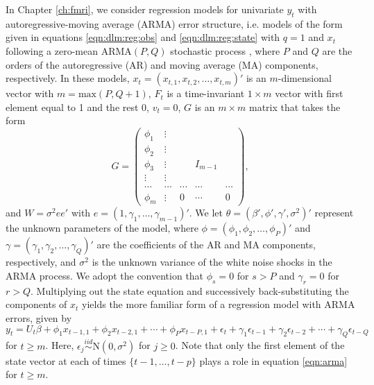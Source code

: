 In Chapter \ref{ch:fmri}, we consider regression models for univariate $y_t$ with autoregressive-moving average (ARMA) error structure, i.e. models of the form given in equations \eqref{eqn:dlm:reg:obs} and \eqref{eqn:dlm:reg:state} with $q = 1$ and $x_t$ following a zero-mean $\mbox{ARMA}(P, Q)$ stochastic process \citep{shum:stof:2006:timeseries}, where $P$ and $Q$ are the orders of the autoregressive (AR) and moving average (MA) components, respectively. In these models, $x_t = (x_{t,1} ,x_{t,2}, \ldots, x_{t,m})'$ is an $m$-dimensional vector with $m = \mbox{max}(P,Q+1)$, $F_t$ is a time-invariant $1 \times m$ vector with first element equal to 1 and the rest 0, $v_t = 0$, $G$ is an $m \times m$ matrix that takes the form
\[
G = \left(
 \begin{array}{ccccc}
 \phi_1 & \vdots \\
 \phi_2 & \vdots \\
 \phi_3 & \vdots && I_{m-1} \\
 \vdots & \vdots \\
 \cdots & \cdots & \cdots & \cdots & \cdots \\
 \phi_m &\vdots & 0 & \cdots & 0
 \end{array}
\right),
\]
and $W = \sigma^2ee'$ with $e = (1, \gamma_1, \ldots, \gamma_{m-1})'$. We let $\theta = (\beta', \phi', \gamma', \sigma^2)'$ represent the unknown parameters of the model, where $\phi = (\phi_1,\phi_2,\ldots,\phi_P)'$ and $\gamma = (\gamma_1,\gamma_2,\ldots,\gamma_Q)'$ are the coefficients of the AR and MA components, respectively, and $\sigma^2$ is the unknown variance of the white noise shocks in the ARMA process. We adopt the convention that $\phi_s = 0$ for $s > P$ and $\gamma_r = 0$ for $r > Q$. Multiplying out the state equation and successively back-substituting the components of $x_t$ \cite[see Sec 3.2.5,][]{petris:camp:2009:dynamic} yields the more familiar form of a regression model with ARMA errors, given by
\begin{equation}
y_t = U_t\beta + \phi_1x_{t-1,1} + \phi_2x_{t-2,1} + \cdots + \phi_Px_{t-P,1} + \epsilon_t + \gamma_1\epsilon_{t-1} + \gamma_2\epsilon_{t-2} + \cdots + \gamma_Q\epsilon_{t-Q} \label{eqn:arma}
\end{equation}
for $t \ge m$. Here, $\epsilon_j \stackrel{iid}{\sim} \mbox{N}(0,\sigma^2)$ for $j \ge 0$. Note that only the first element of the state vector at each of times $\{t-1,\ldots,t-p\}$ plays a role in equation \eqref{eqn:arma} for $t \ge m$.

